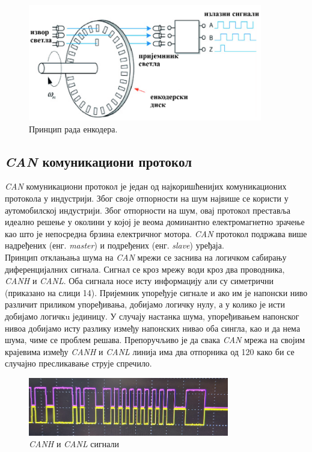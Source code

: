 \documentclass{article}
\begin{document}
\begin{figure}[H]
\centering
\includegraphics[height=2in]{Images/InkrementalniEnkoder.png }
\caption{Принцип рада енкодера.\cite{encoder}}
\label{fig:figure13}
\end{figure}

\subsection{\textit{CAN} комуникациони протокол}
\textit{CAN} комуникациони протокол је један од најкоришћенијих комуникационих протокола у индустрији. Због своје отпорности на шум највише се користи у аутомобилској индустрији. Због отпорности на шум, овај протокол преставља идеално решење у околини у којој је веома доминантно електромагнетно зрачење као што је непосредна брзина електричног мотора.
\textit{CAN} протокол подржава више надређених (енг. \textit{master}) и подређених (енг. \textit{slave}) уређаја. \\
Принцип отклањања шума на \textit{CAN} мрежи се заснива на логичком сабирању диференцијалних сигнала. Сигнал се кроз мрежу води кроз два проводника, \textit{CANH} и \textit{CANL}. Оба сигнала носе исту информацију али су симетрични (приказано на слици 14). Пријемник упоређује сигнале и ако им је напонски ниво различит приликом упоређивања, добијамо логичку нулу, а у колико је исти добијамо логичкu јединицу. У случају настанка шума, упоређивањем напонског нивоа добијамо исту разлику између напонских нивао оба сингла, као и да нема шума, чиме се проблем решава. Препоручљиво је да свака \textit{CAN} мрежа на својим крајевима између \textit{CANH} и \textit{CANL} линија има два отпорника од 120 \ohm како би се случајно пресликавање струје спречило. \\
\begin{figure}[H]
\centering
\includegraphics[height=1in]{Images/CAN_Osci.jpg }
\caption{\textit{CANH} и \textit{CANL} сигнали}
\label{fig:figure14}
\end{figure}
\end{document}

